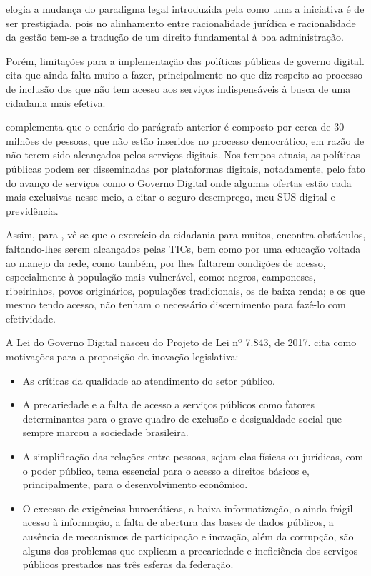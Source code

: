 \cite{do2022governo} elogia a mudança do paradigma legal introduzida pela  como uma a iniciativa é de ser prestigiada, pois no alinhamento entre racionalidade jurídica e racionalidade da gestão tem-se a tradução de um direito fundamental à boa administração.

Porém, limitações para a implementação das políticas públicas de governo digital. \cite{reck2021transformaccao} cita que ainda falta muito a fazer, principalmente no que diz respeito ao processo de inclusão dos que não tem acesso aos serviços indispensáveis à busca de uma cidadania mais efetiva. 

\cite{reck2021transformaccao} complementa que o cenário do parágrafo anterior é composto por cerca de 30 milhões de pessoas, que não estão inseridos no processo democrático, em razão de não terem sido alcançados pelos serviços digitais.  Nos tempos atuais, as políticas públicas podem ser disseminadas por plataformas digitais, notadamente, pelo fato do avanço de serviços como o Governo Digital onde algumas ofertas estão cada mais exclusivas nesse meio, a citar o seguro-desemprego, meu SUS digital e previdência.

Assim, para  \cite{reck2021transformaccao}, vê-se que o exercício da cidadania para muitos, encontra obstáculos, faltando-lhes serem alcançados pelas TICs, bem como por uma educação voltada ao manejo da rede, como também, por lhes faltarem condições de acesso, especialmente à população mais vulnerável, como: negros, camponeses, ribeirinhos, povos originários, populações tradicionais, os de baixa renda; e os que mesmo tendo acesso, não tenham o necessário discernimento para fazê-lo com efetividade.

A Lei do Governo Digital nasceu do Projeto de Lei nº 7.843, de 2017. \cite{pl_lgd} cita como motivações para a proposição da inovação legislativa:

\begin{itemize}
    \item As críticas da qualidade ao atendimento do setor público.
    \item A precariedade e a falta de acesso a serviços públicos como fatores determinantes para o grave quadro de exclusão e desigualdade social que sempre marcou a sociedade brasileira. 
    \item  A simplificação das relações entre pessoas,
    sejam elas físicas ou jurídicas, com o poder público, tema essencial para o acesso a direitos básicos e, principalmente, para o desenvolvimento econômico.
    \item O excesso de exigências burocráticas, a baixa informatização, o ainda frágil acesso à informação, a falta de abertura das bases de dados públicos, a ausência de mecanismos de participação e inovação, além da corrupção, são alguns dos problemas que explicam a precariedade e ineficiência dos serviços públicos prestados
    nas três esferas da federação.
\end{itemize}

